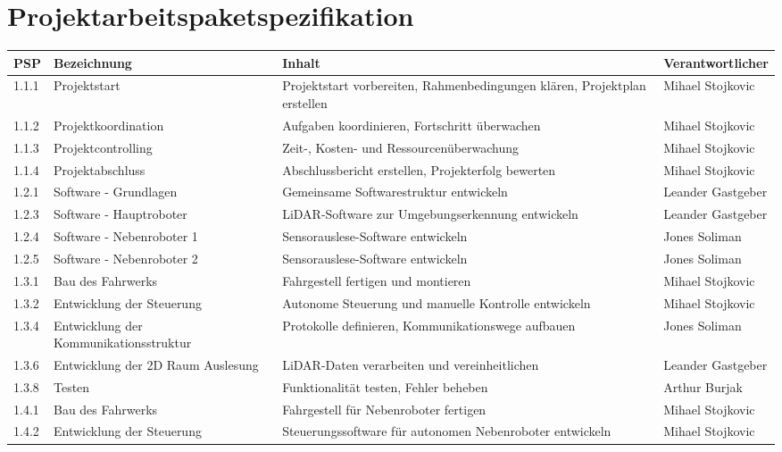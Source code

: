 \newpage

\section{Projektarbeitspaketspezifikation}

\begin{longtable}[c]{|p{1cm}|p{5cm}|p{5cm}|l|}
\hline
\textbf{PSP} & \textbf{Bezeichnung} & \textbf{Inhalt} & \textbf{Verantwortlicher} \\
\hline
1.1.1 & Projektstart & Projektstart vorbereiten, Rahmenbedingungen klären, Projektplan erstellen & Mihael Stojkovic \\
\hline
1.1.2 & Projektkoordination & Aufgaben koordinieren, Fortschritt überwachen & Mihael Stojkovic \\
\hline
1.1.3 & Projektcontrolling & Zeit-, Kosten- und Ressourcenüberwachung & Mihael Stojkovic \\
\hline
1.1.4 & Projektabschluss & Abschlussbericht erstellen, Projekterfolg bewerten & Mihael Stojkovic \\
\hline
1.2.1 & Software - Grundlagen & Gemeinsame Softwarestruktur entwickeln & Leander Gastgeber \\
\hline
1.2.3 & Software - Hauptroboter & LiDAR-Software zur Umgebungserkennung entwickeln & Leander Gastgeber \\
\hline
1.2.4 & Software - Nebenroboter 1 & Sensorauslese-Software entwickeln & Jones Soliman \\
\hline
1.2.5 & Software - Nebenroboter 2 & Sensorauslese-Software entwickeln & Jones Soliman \\
\hline
1.3.1 & Bau des Fahrwerks & Fahrgestell fertigen und montieren & Mihael Stojkovic \\
\hline
1.3.2 & Entwicklung der Steuerung & Autonome Steuerung und manuelle Kontrolle entwickeln & Mihael Stojkovic \\
\hline
1.3.4 & Entwicklung der Kommunikationsstruktur & Protokolle definieren, Kommunikationswege aufbauen & Jones Soliman \\
\hline
1.3.6 & Entwicklung der 2D Raum Auslesung & LiDAR-Daten verarbeiten und vereinheitlichen & Leander Gastgeber \\
\hline
1.3.8 & Testen & Funktionalität testen, Fehler beheben & Arthur Burjak \\
\hline
1.4.1 & Bau des Fahrwerks & Fahrgestell für Nebenroboter fertigen & Mihael Stojkovic \\
\hline
1.4.2 & Entwicklung der Steuerung & Steuerungssoftware für autonomen Nebenroboter entwickeln & Mihael Stojkovic \\

\end{longtable}
